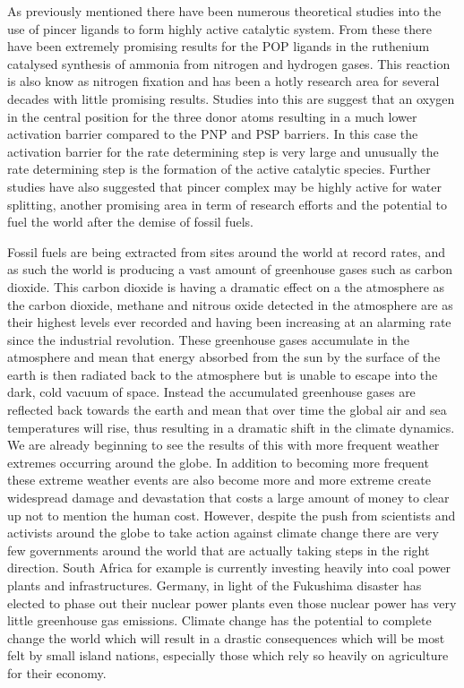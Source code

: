 As previously mentioned there have been numerous theoretical studies into the use of pincer ligands to form highly active catalytic system.  From these there have been extremely promising results for the POP ligands in the ruthenium catalysed synthesis of ammonia from nitrogen and hydrogen gases.  This reaction is also know as nitrogen fixation and has been a hotly research area for several decades with little promising results.  Studies into this are suggest that an oxygen in the central position for the three donor atoms resulting in a much lower activation barrier compared to the PNP and PSP barriers.  In this case the activation barrier for the rate determining step is very large and unusually the rate determining step is the formation of the active catalytic species.  Further studies have also suggested that pincer complex may be highly active for water splitting, another promising area in term of research efforts and the potential to fuel the world after the demise of fossil fuels.  

Fossil fuels are being extracted from sites around the world at record rates, and as such the world is producing a vast amount of greenhouse gases such as carbon dioxide.  This carbon dioxide is having a dramatic effect on a the atmosphere as the carbon dioxide, methane and nitrous oxide detected in the atmosphere are as their highest levels ever recorded and having been increasing at an alarming rate since the industrial revolution.  These greenhouse gases accumulate in the atmosphere and mean that energy absorbed from the sun by the surface of the earth is then radiated back to the atmosphere but is unable to escape into the dark, cold vacuum of space.  Instead the accumulated greenhouse gases are reflected back towards the earth and mean that over time the global air and sea temperatures will rise, thus resulting in a dramatic shift in the climate dynamics.  We are already beginning to see the results of this with more frequent weather extremes occurring around the globe.  In addition to becoming more frequent these extreme weather events are also become more and more extreme create widespread damage and devastation that costs a large amount of money to clear up not to mention the human cost.  However, despite the push from scientists and activists around the globe to take action against climate change there are very few governments around the world that are actually taking steps in the right direction.  South Africa for example is currently investing heavily into coal power plants and infrastructures.  Germany, in light of the Fukushima disaster has elected to phase out their nuclear power plants even those nuclear power has very little greenhouse gas emissions.  Climate change has the potential to complete change the world which will result in a drastic consequences which will be most felt by small island nations, especially those which rely so heavily on agriculture for their economy. 

